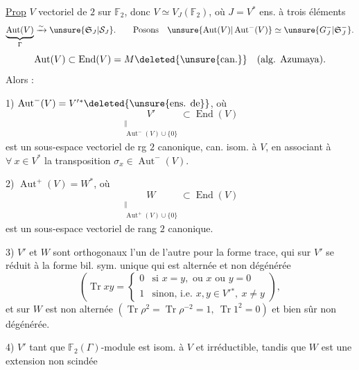 \uline{Prop} $V$ vectoriel de  $2$ sur $\mathbb F_2$, donc $V\simeq V_J(\mathbb F_2)$, où $J=V^*$ ens. à trois éléments
\[
\underbrace{\operatorname{Aut}(V)}_{\Gamma}\xrightarrow{\sim}\unsure{\mathfrak S_J|\mathcal S_J}.
\qquad\text{Posons}\quad\unsure{\operatorname{Aut}(V)|\operatorname{Aut}^-(V)}\simeq\unsure{G_J^-|\mathfrak S_J^-}.
\]
\[
\operatorname{Aut}(V)\subset\operatorname{End}(V)=M\deleted{\text{\unsure{can.}}}\quad(\text{alg. Azumaya}).
\]
Alors :

1) $\operatorname{Aut}^-(V)=V'{}^*\deleted{\text{\unsure{ens. de}}}$, où
\[
\underset{\substack{\Vert\\\operatorname{Aut}^-(V)\cup\{0\}}}{V'}\subset\operatorname{End}(V)
\]
est un sous-espace vectoriel de rg $2$ canonique, can. isom. à $V$, en associant à $\forall\ x\in V^*$ la transposition $\sigma_x\in\operatorname{Aut}^-(V)$.

2) $\operatorname{Aut}^+(V)=W^*$, où
\[
\underset{\substack{\Vert\\\operatorname{Aut}^+(V)\cup\{0\}}}{W}\subset\operatorname{End}(V)
\]
est un sous-espace vectoriel de rang $2$ canonique.

3) $V'$ et $W$ sont orthogonaux l'un de l'autre pour la forme trace, qui sur $V'$ se réduit à la forme bil. sym. unique qui est alternée et non dégénérée
\[
(\operatorname{Tr}xy=\begin{cases}
0&\text{si }x=y,\text{ ou }x\text{ ou }y=0\\
1&\text{sinon, i.e. }x,y\in V'{}^*,\ x\ne y
\end{cases}),
\]
et sur $W$ est non alternée $(\operatorname{Tr}\rho^2=\operatorname{Tr}\rho^{-2}=1,\ \operatorname{Tr}1^2=0)$ et bien sûr non dégénérée.

4) $V'$  tant que $\mathbb F_2(\Gamma)$-module est isom. à $V$ et irréductible, tandis que $W$ est une extension non scindée
\hfill{}
